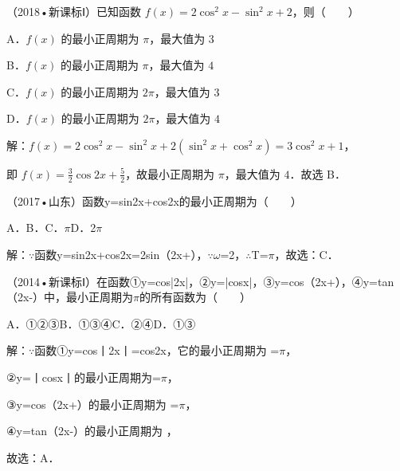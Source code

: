 \begin{question}
（2018•新课标Ⅰ）已知函数 $f(x)=2\cos^2x-\sin^2x+2$，则（　　）\par
A．$f(x)$ 的最小正周期为 $\pi$，最大值为 $3$\par
B．$f(x)$ 的最小正周期为 $\pi$，最大值为 $4$\par
C．$f(x)$ 的最小正周期为 $2\pi$，最大值为 $3$\par
D．$f(x)$ 的最小正周期为 $2\pi$，最大值为 $4$\par
\begin{solution}
解：$f(x)=2\cos^2x-\sin^2x+2(\sin^2x+\cos^2x)=3\cos^2x+1$，\par
即 $f(x)=\frac32\cos2x+\frac52$，故最小正周期为 $\pi$，最大值为 $4$．故选 B．\par
\end{solution}
\end{question}

\begin{question}
（2017•山东）函数y=sin2x+cos2x的最小正周期为（　　）\par
A．\qquad{}B．\qquad{}C．\ensuremath{\pi}\qquad{}D．2\ensuremath{\pi}\par
\begin{solution}
解：\ensuremath{\because}函数y=sin2x+cos2x=2sin（2x+），\ensuremath{\because}\ensuremath{\omega}=2，\ensuremath{\therefore}T=\ensuremath{\pi}，故选：C．\par
\end{solution}
\end{question}

\begin{question}
（2014•新课标Ⅰ）在函数①y=cos|2x|，②y=|cosx|，③y=cos（2x+），④y=tan（2x-）中，最小正周期为\ensuremath{\pi}的所有函数为（　　）\par
A．①②③\qquad{}B．①③④\qquad{}C．②④\qquad{}D．①③\par
\begin{solution}
解：\ensuremath{\because}函数①y=cos丨2x丨=cos2x，它的最小正周期为 =\ensuremath{\pi}，\par
②y=丨cosx丨的最小正周期为=\ensuremath{\pi}，\par
③y=cos（2x+）的最小正周期为 =\ensuremath{\pi}，\par
④y=tan（2x-）的最小正周期为 ，\par
故选：A．\par
{}\par
\end{solution}
\end{question}

